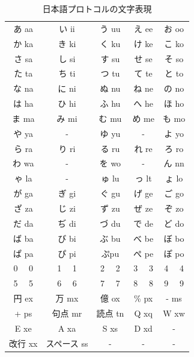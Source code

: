 \documentclass[a4j]{jarticle}
\begin{document}
      \begin{table}[H]
        \caption{日本語プロトコルの文字表現}
      \label{jpp}
      \begin{center}
          \begin{tabular}{c|c|c|c|c}\hline
あ aa & い ii & う uu & え ee & お oo \\ 
か ka & き ki & く ku & け ke & こ ko \\ 
さ sa & し si & す su & せ se & そ so \\ 
た ta & ち ti & つ tu & て te & と to \\ 
な na & に ni & ぬ nu & ね ne & の no \\ 
は ha & ひ hi & ふ hu & へ he & ほ ho \\ 
ま ma & み mi & む mu & め me & も mo \\ 
や ya & -  & ゆ yu & -  & よ yo \\ 
ら ra & り ri & る ru & れ re & ろ ro \\ 
わ wa & -  & を wo & -  & ん nn \\ 
ゃ la & - & ゅ lu & っ lt & ょ lo \\ 
が ga & ぎ gi & ぐ gu & げ ge & ご go \\ 
ざ za & じ zi & ず zu & ぜ ze & ぞ zo \\
だ da & ぢ di & づ du & で de & ど do \\
ば ba & び bi & ぶ bu & べ be & ぼ bo \\ 
ぱ pa & ぴ pi & ぷpu &  ぺ pe & ぽ po \\ 
0 　0 & 1 　1 & 2 　2 & 3 　3 & 4 　4 \\ 
5 　5 & 6 　6 & 7 　7 & 8 　8 & 9 　9 \\ 
円 ex & 万 mx & 億 ox & \% px & - ms \\ 
+ ps & 句点 mr & 読点 tn & Q xq & W xw \\ 
E xe & A xa & S xs & D xd & - \\ 
改行 xx & スペース ss & - & - & - \\ \hline
          \end{tabular}
      \end{center}
      \end{table}
      
\end{document}
